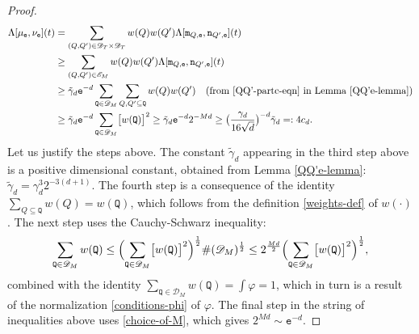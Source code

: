\documentclass[a4paper,11pt]{amsart}
\numberwithin{equation}{section}
\begin{document}
\begin{proof}
\begin{align*}
\Lambda[\mu_{\mathtt e}, \nu_{\mathtt e}](t) &=  \sum_{(Q, Q') \in \mathscr{D}_T \times \mathscr{D}_T} w(Q) w(Q') \Lambda[\mathtt m_{Q, \mathtt e}, \mathtt n_{Q', \mathtt e}](t) \\ 
&\geq \sum_{(Q, Q') \in \mathscr{E}_M} w(Q) w(Q') \Lambda[\mathtt m_{Q, \mathtt e}, \mathtt n_{Q', \mathtt e}](t) \\ 
&\geq \tilde{\gamma}_d \mathtt e^{-d} \sum_{\mathtt Q \in \mathscr{D}_M} \sum_{Q, Q' \subseteq \mathtt Q} w(Q) w(Q') \quad \text{(from \eqref{QQ'-partc-eqn} in Lemma \ref{QQ'e-lemma})}\\
&  \geq \tilde{\gamma}_d \mathtt e^{-d} \sum_{\mathtt Q \in \mathscr{D}_M} \bigl[ w(\mathtt Q) \bigr]^2 
\geq \tilde{\gamma}_d \mathtt e^{-d} 2^{-Md} \geq \bigl(\frac{\gamma_d}{16 \sqrt{d}} \bigr)^{-d} \tilde{\gamma}_d =: 4c_d. 
\end{align*} 
Let us justify the steps above. The constant $\tilde{\gamma}_d$ appearing in the third step above is a positive dimensional constant, obtained from Lemma 
\ref{QQ'e-lemma}: $\tilde{\gamma}_d = \gamma_d^{3} 2^{-3(d+1)}$.  The fourth step is a consequence of the identity $\sum_{Q \subseteq \mathtt Q} w(Q) = w(\mathtt Q)$, which follows from the definition \eqref{weights-def} of $w(\cdot)$. The next step uses the Cauchy-Schwarz inequality: 
\[ \sum_{\mathtt Q \in \mathscr{D}_M}w(\mathtt Q) \leq \Bigl( \sum_{\mathtt Q \in \mathscr{D}_M} \bigl[ w(\mathtt Q) \bigr]^2 \Bigr)^{\frac{1}{2}} \#(\mathscr{D}_M)^{\frac12} \leq 2^{\frac{Md}{2}}  \Bigl( \sum_{\mathtt Q \in \mathscr{D}_M} \bigl[ w(\mathtt Q) \bigr]^2 \Bigr)^{\frac{1}{2}}, \] combined with the identity $\sum_{\mathtt Q \in \mathscr{D}_M} w(\mathtt Q) = \int \varphi = 1$, which in turn is a result of  the normalization \eqref{conditions-phi} of $\varphi$. The final step in the string of inequalities above uses \eqref{choice-of-M}, which gives $2^{Md} \sim \mathtt e^{-d}$. 
\end{proof} 
\end{document}
